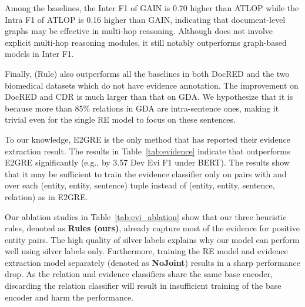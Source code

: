 Among the baselines, the Inter F1 of GAIN is 0.70 higher than ATLOP while the Intra F1 of ATLOP is 0.16 higher than GAIN, indicating that document-level graphs may be effective in multi-hop reasoning.
Although \ours does not involve explicit multi-hop reasoning modules, it still notably outperforms graph-based models in Inter F1.

Finally, \ours (Rule) also outperforms all the baselines in both DocRED and the two biomedical datasets which do not have evidence annotation.
The improvement on DocRED and CDR is much larger than that on GDA. We hypothesize that it is because more than 85\% relations in GDA are intra-sentence ones, making it trivial even for the single RE model to focus on these sentences.



\begin{table}[t]
\centering
{}
    \upv
    \caption{Evidence extraction results on DocRED. We compare \ours with E2GRE \citep{E2GRE}.}
    \label{tab:evidence}
    \downv
\end{table}

\smallskip
{} 
To our knowledge, E2GRE is the only method that has reported their evidence extraction result.
The results in Table~\ref{tab:evidence} indicate that \ours outperforms E2GRE significantly (e.g., by 3.57 Dev Evi F1 under BERT).
The results show that it may be sufficient to train the evidence classifier only on pairs with  and over each (entity, entity, sentence) tuple instead of (entity, entity, sentence, relation) as in E2GRE.

Our ablation studies in Table~\ref{tab:evi_ablation} show that our three heuristic rules, denoted as \textbf{Rules (ours)}, already capture most of the evidence for positive entity pairs. The high quality of silver labels explains why our model can perform well using silver labels only.
Furthermore, training the RE model and evidence extraction model separately (denoted as \textbf{NoJoint}) results in a sharp performance drop. 
As the relation and evidence classifiers share the same base encoder, discarding the relation classifier will result in insufficient training of the base encoder and harm the performance.

